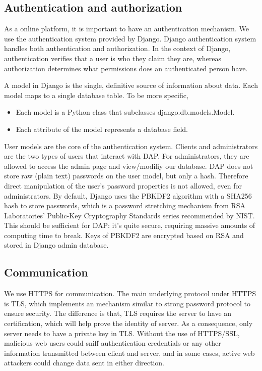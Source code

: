 \subsection{Authentication and authorization}
\label{sec: aa}

As a online platform, it is important to have an authentication mechanism. We use the authentication system provided by Django. Django authentication system handles both authentication and authorization. In the context of Django, authentication verifies that a user is who they claim they are, whereas authorization determines what permissions does an authenticated person have.

A model in Django is the single, definitive source of information about data. Each model maps to a single database table. To be more specific,

\begin{itemize}
    \item Each model is a Python class that subclasses django.db.models.Model.
    \item Each attribute of the model represents a database field.
\end{itemize}

User models are the core of the authentication system. Clients and administrators are the two types of users that interact with DAP. For administrators, they are allowed to access the admin page and view/modifiy our database. DAP does not store raw (plain text) passwords on the user model, but only a hash. Therefore direct manipulation of the user's password properties is not allowed, even for administrators. By default, Django uses the PBKDF2 \cite{kaliski2000pkcs} algorithm with a SHA256 hash to store passwords, which is a password stretching mechanism from RSA Laboratories’ Public-Key Cryptography Standards series recommended by NIST. This should be sufficient for DAP: it’s quite secure, requiring massive amounts of computing time to break. Keys of PBKDF2 are encrypted based on RSA and stored in Django admin database. 

\subsection{Communication}

We use HTTPS for communication. The main underlying protocol under HTTPS is TLS, which implements an mechanism similar to strong password protocol to ensure security. The difference is that, TLS requires the server to have an certification, which will help prove the identity of server. As a consequence, only server needs to have a private key in TLS. Without the use of HTTPS/SSL, malicious web users could sniff authentication credentials or any other information transmitted between client and server, and in some cases, active web attackers could change data sent in either direction.

